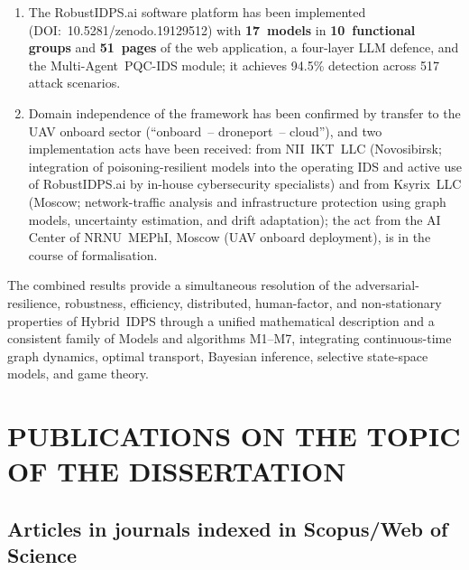 \documentclass[12pt,a5paper]{article}
\begin{document}
\begin{enumerate}
\item The RobustIDPS.ai software platform has been implemented
(DOI:~10.5281/zenodo.19129512) with \textbf{17~models} in
\textbf{10~functional groups} and \textbf{51~pages} of the web
application, a four-layer LLM defence, and the
Multi-Agent~PQC-IDS module; it achieves 94.5\% detection
across 517 attack scenarios.

\item Domain independence of the framework has been confirmed
by transfer to the UAV onboard sector
(``onboard~-- droneport~-- cloud''), and two implementation
acts have been received: from NII~IKT~LLC (Novosibirsk;
integration of poisoning-resilient models into the operating
IDS and active use of RobustIDPS.ai by in-house cybersecurity
specialists) and from Ksyrix~LLC (Moscow; network-traffic
analysis and infrastructure protection using graph models,
uncertainty estimation, and drift adaptation); the act from
the AI Center of NRNU~MEPhI, Moscow (UAV onboard deployment),
is in the course of formalisation.
\end{enumerate}

The combined results provide a simultaneous resolution of the
adversarial-resilience, robustness, efficiency, distributed,
human-factor, and non-stationary properties of Hybrid~IDPS
through a unified mathematical description and a consistent
family of Models and algorithms M1--M7, integrating
continuous-time graph dynamics, optimal transport, Bayesian
inference, selective state-space models, and game theory.

\vspace{1cm}

\section*{PUBLICATIONS ON THE TOPIC OF THE DISSERTATION}

\sloppy

\subsection*{Articles in journals indexed in Scopus/Web of Science}
\end{document}
